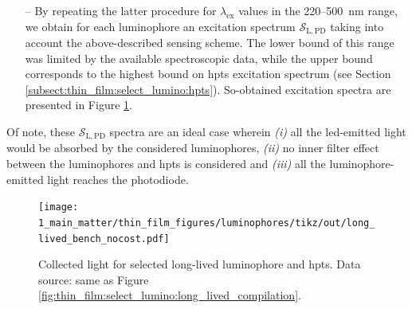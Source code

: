 \begin{itemize}
\begin{equation}
	\end{equation}
	\item[--] By repeating the latter procedure for $\lambda_\mathrm{ex}$ values in the 220--500~nm range, we obtain for each luminophore an excitation spectrum $\mathcal{S}_\mathrm{L,PD}$ taking into account the above-described sensing scheme. The lower bound of this range was limited by the available spectroscopic data, while the upper bound corresponds to the highest bound on \gls{hpts} excitation spectrum (see Section \ref{subsect:thin_film:select_lumino:hpts}). So-obtained excitation spectra are presented in Figure \ref{fig:thin_film:select_lumino:long_lived_bench_nocost}.
\end{itemize}
Of note, these $\mathcal{S}_\mathrm{L,PD}$ spectra are an ideal case wherein \textit{(i)} all the \gls{led}-emitted light would be absorbed by the considered luminophores, \textit{(ii)} no inner filter effect between the luminophores and \gls{hpts} is considered and \textit{(iii)} all the luminophore-emitted light reaches the photodiode. %

\begin{figure}
	\centering
	\texttt{[image: 1\_main\_matter/thin\_film\_figures/luminophores/tikz/out/long\_lived\_bench\_nocost.pdf]}
	\caption[Collected light for selected long-lived luminophore and \gls{hpts}.]{Collected light for selected long-lived luminophore and \gls{hpts}. Data source: same as Figure \ref{fig:thin_film:select_lumino:long_lived_compilation}.}
	\label{fig:thin_film:select_lumino:long_lived_bench_nocost}
\end{figure}

